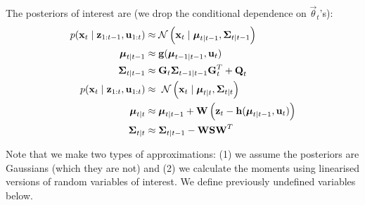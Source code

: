 The posteriors of interest are (we drop the conditional dependence on $\vec \theta_t$'s):
\begin{align}
	p(\vec x_t \mid \vec z_{1:t - 1}, \vec u_{1:t})	&\approx \Gauss\left(\vec x_t \mid \vec \mu_{t \mid t - 1}, \vec\Sigma_{t \mid t - 1}\right) \\
	\vec \mu_{t \mid t - 1}							&\approx \vec g(\vec \mu_{t - 1 \mid t - 1}, \vec u_t) \\
	\vec \Sigma_{t \mid t - 1}						&\approx \vec G_t \vec \Sigma_{t - 1 \mid t - 1} \vec G_t^T + \vec Q_t \\
	p(\vec x_t \mid \vec z_{1:t}, \vec u_{1:t}) 	&\approx\ \Gauss\left(\vec x_t \mid \vec \mu_{t \mid t}, \vec\Sigma_{t \mid t}\right) \\
	\vec \mu_{t \mid t}								&\approx \vec \mu_{t \mid t - 1} + \vec W \left(\vec z_t - \vec h(\vec \mu_{t \mid t - 1}, \vec u_t)\right) \\
	\vec \Sigma_{t \mid t}							&\approx \vec \Sigma_{t \mid t - 1} - \vec W \vec S \vec W^T
\end{align}

Note that we make two types of approximations: (1) we assume the posteriors are Gaussians (which they are not) and (2) we calculate the moments using linearised versions of random variables of interest. We define previously undefined variables below.

